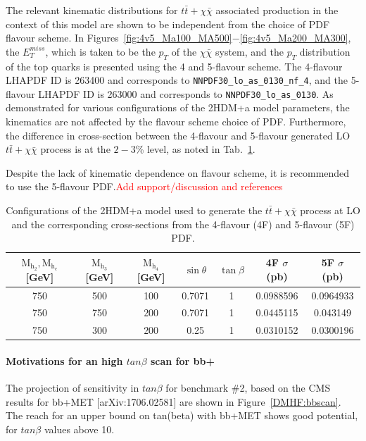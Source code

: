The relevant kinematic distributions for $t\bar{t}+\chi\bar{\chi}$ associated production in the context of this model are shown to be independent from the choice of PDF flavour scheme. In Figures~\ref{fig:4v5_Ma100_MA500}$-$\ref{fig:4v5_Ma200_MA300}, the $E_{T}^{miss}$, which is taken to be the $p_{T}$ of the $\chi\bar{\chi}$ system, and the $p_{T}$ distribution of the top quarks is presented using the 4 and 5-flavour scheme. The 4-flavour LHAPDF ID is 263400 and corresponds to \texttt{NNPDF30\_lo\_as\_0130\_nf\_4}, and the 5-flavour LHAPDF ID is 263000 and corresponds to \texttt{NNPDF30\_lo\_as\_0130}. As demonstrated for various configurations of the 2HDM+a model parameters, the kinematics are not affected by the flavour scheme choice of PDF. Furthermore, the difference in cross-section between the 4-flavour and 5-flavour generated LO $t\bar{t}+\chi\bar{\chi}$ process is at the $2-3$\% level, as noted in Tab.~\ref{tab:4v5_xsec}.

Despite the lack of kinematic dependence on flavour scheme, it is recommended to use the 5-flavour PDF.\textcolor{red}{Add support/discussion and references}

\begin{table}[htbp]
  \begin{tabular}{|c|c|c|c|c|c|c|}
    \hline
    $\mathrm{M_{h_{2}}},\mathrm{M_{h_{c}}}$ [GeV] & $\mathrm{M_{h_{3}}}$ [GeV] & $\mathrm{M_{h_{4}}}$ [GeV] & $\sin\theta$ & $\tan\beta$ & 4F $\sigma$ (pb) & 5F $\sigma$ (pb) \\
    \hline \hline
    750 & 500 & 100 & 0.7071 & 1 & 0.0988596 & 0.0964933 \\
    \hline
    750 & 750 & 200 & 0.7071 & 1 & 0.0445115 & 0.043149 \\
    \hline
    750 & 300 & 200 & 0.25 & 1 & 0.0310152 & 0.0300196 \\ 
    \hline
  \end{tabular}
  \caption{Configurations of the 2HDM+a model used to generate the $t\bar{t}+\chi\bar{\chi}$ process at LO and the corresponding cross-sections from the 4-flavour (4F) and 5-flavour (5F) PDF.}
  \label{tab:4v5_xsec}
\end{table}
\paragraph{Motivations for an high $tan\beta$ scan for bb+\met}

The projection of sensitivity in $tan\beta$ for benchmark \#2,  based on the CMS results for bb+MET [arXiv:1706.02581]
are shown in Figure~\ref{DMHF:bbscan}. The reach for an upper bound on tan(beta) with bb+MET shows 
good potential, for $tan\beta$ values above 10. 

